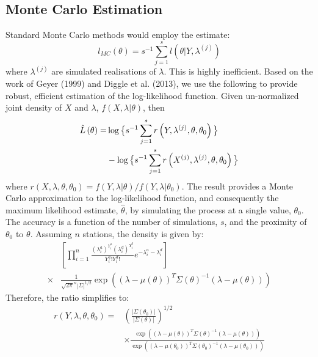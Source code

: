 \documentclass{acm_proc_article-sp}
\begin{document}
\subsection{Monte Carlo Estimation} \label{mc_estimation}
Standard Monte Carlo methods would employ the estimate:
\begin{equation}
l_{MC} (\theta) = s^{-1} \sum_{j=1}^s l \left( \theta | Y, \lambda^{(j)} \right)
\end{equation}
\noindent where $\lambda^{(j)}$ are simulated realisations of $\lambda$.  This is highly inefficient.  Based on the work of Geyer (1999) and Diggle et al. (2013), we use the following to provide robust, efficient estimation of the log-likelihood function.  Given un-normalized joint density of $X$ and $\lambda$, $f(X, \lambda | \theta)$, then 
\begin{align}
\hat{L} \left( \theta \right) =& \log \big \{ s^{-1} \sum_{j=1}^s r \left( Y , \lambda^{(j)} , \theta, \theta_0 \right) \big \} \label{approx_lik} \\
&- \log \big \{ s^{-1} \sum_{j=1}^s r \left( X^{(j)} , \lambda^{(j)} , \theta, \theta_0 \right) \big \} \notag
\end{align}
\noindent where $r(X, \lambda, \theta, \theta_0) = f(Y, \lambda | \theta)/f(Y, \lambda | \theta_0)$. The result provides a Monte Carlo approximation to the log-likelihood function, and consequently the maximum likelihood estimate, $\hat{\theta}$, by simulating the process at a single value, $\theta_0$.  The accuracy is a function of the number of simulations, $s$, and the proximity of $\theta_0$ to $\theta$.   Assuming $n$ stations, the density is given by:
\begin{align*}
&\left[ \prod_{i=1}^n \frac{(\lambda_i^a)^{Y_i^a}(\lambda_i^d)^{Y_i^d}}{Y_i^a ! Y_i^d !} e^{-\lambda_i^a - \lambda_i^d} \right] \\
\times& \frac{1}{\sqrt{2 \pi}^n |\Sigma|^{1/2}} \exp \left( (\lambda - \mu(\theta))^T \Sigma(\theta)^{-1} (\lambda - \mu(\theta) ) \right)
\end{align*}
Therefore, the ratio simplifies to:
\begin{align*}
r(Y,\lambda, \theta, \theta_0) =& \left(\frac{|\Sigma (\theta_0)|}{|\Sigma (\theta)|} \right)^{1/2} \\
&\times \frac{\exp \left( (\lambda - \mu(\theta))^T \Sigma(\theta)^{-1} (\lambda - \mu(\theta) ) \right)}{\exp \left( (\lambda - \mu(\theta_0))^T \Sigma(\theta_0)^{-1} (\lambda - \mu(\theta_0) ) \right)} \\
\end{align*}
\end{document}
